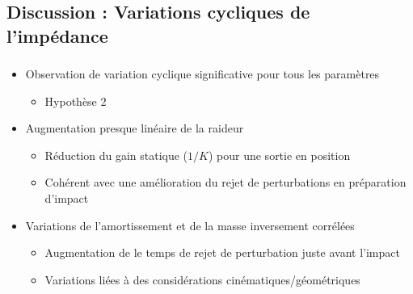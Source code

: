 \documentclass[10pt,xcolor=table]{beamer}
\begin{document}
\subsection{Discussion : Variations cycliques de l'impédance}
\begin{frame}
	\frametitle{\insertsubsection}
	\begin{itemize}[<+->]
		\item Observation de variation cyclique significative pour tous les paramètres
		\begin{itemize}
			\item[$\Rightarrow$] Hypothèse 2
		\end{itemize}
		\item Augmentation presque linéaire de la raideur
		\begin{itemize}
			\item Réduction du gain statique ($1/K$)	pour une sortie en position
			\item[$\Rightarrow$] Cohérent avec une amélioration du rejet de perturbations en préparation d'impact 
		\end{itemize}
		\item Variations de l'amortissement et de la masse inversement corrélées
		\begin{itemize}
			\item Augmentation de le temps de rejet de perturbation juste avant l'impact
			\item[$\Rightarrow$] Variations liées à des considérations cinématiques/géométriques
		\end{itemize}		
	\end{itemize}
\end{frame}

\end{document}
